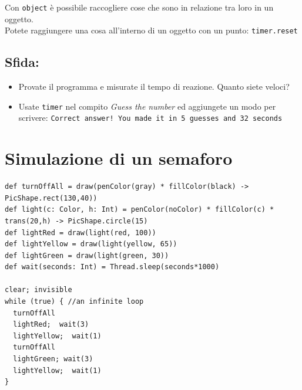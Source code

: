Con \lstinline{object} è possibile raccogliere cose che sono in relazione tra loro in un oggetto.\\
Potete raggiungere una cosa all'interno di un oggetto con un punto: \lstinline{timer.reset}
\section*{\color{BrickRed}Sfida:}


\begin{itemize}

\item {Provate il programma e misurate il tempo di reazione. Quanto siete veloci?}
\item {Usate \lstinline{timer} nel compito {\it Guess the number} ed aggiungete un modo per scrivere: \lstinline{Correct answer! You made it in 5 guesses and 32 seconds}}

\end{itemize}


\chapter{Simulazione di un semaforo}
  

\begin{lstlisting}[basicstyle={\ttfamily\fontsize{14}{17}\selectfont},numbers=none]
def turnOffAll = draw(penColor(gray) * fillColor(black) -> PicShape.rect(130,40))
def light(c: Color, h: Int) = penColor(noColor) * fillColor(c) * trans(20,h) -> PicShape.circle(15)
def lightRed = draw(light(red, 100))
def lightYellow = draw(light(yellow, 65))
def lightGreen = draw(light(green, 30))
def wait(seconds: Int) = Thread.sleep(seconds*1000)

clear; invisible  
while (true) { //an infinite loop
  turnOffAll
  lightRed;  wait(3)
  lightYellow;  wait(1) 
  turnOffAll
  lightGreen; wait(3)
  lightYellow;  wait(1)
}
\end{lstlisting}
        
